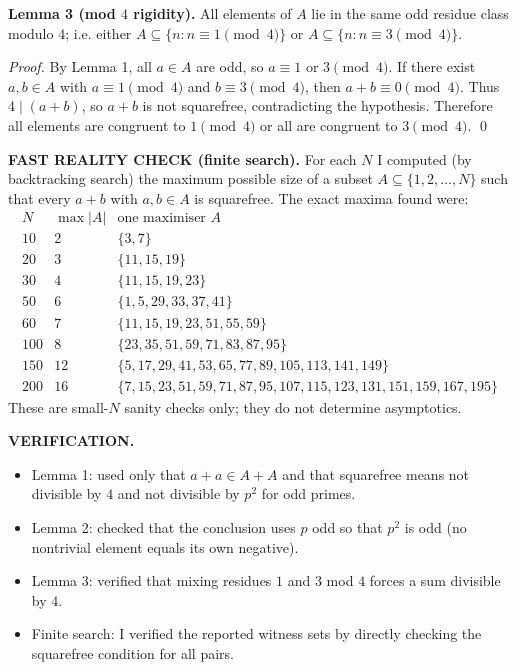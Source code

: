 \medskip
\noindent\textbf{Lemma 3 (mod $4$ rigidity).}
All elements of $A$ lie in the same odd residue class modulo $4$; i.e. either $A\subseteq\{n: n\equiv 1\pmod 4\}$ or $A\subseteq\{n: n\equiv 3\pmod 4\}$.

\noindent\emph{Proof.}
By Lemma 1, all $a\in A$ are odd, so $a\equiv 1$ or $3\pmod 4$.
If there exist $a,b\in A$ with $a\equiv 1\pmod 4$ and $b\equiv 3\pmod 4$, then $a+b\equiv 0\pmod 4$.
Thus $4\mid(a+b)$, so $a+b$ is not squarefree, contradicting the hypothesis.
Therefore all elements are congruent to $1\pmod 4$ or all are congruent to $3\pmod 4$. \qed

\medskip
\noindent\textbf{FAST REALITY CHECK (finite search).}
For each $N$ I computed (by backtracking search) the maximum possible size of a subset $A\subseteq\{1,2,\dots,N\}$ such that every $a+b$ with $a,b\in A$ is squarefree.
The exact maxima found were:
\[
\begin{array}{c|c|l}
N & \max|A| & \text{one maximiser }A\\\hline
10 & 2 & \{3,7\}\\
20 & 3 & \{11,15,19\}\\
30 & 4 & \{11,15,19,23\}\\
50 & 6 & \{1,5,29,33,37,41\}\\
60 & 7 & \{11,15,19,23,51,55,59\}\\
100 & 8 & \{23,35,51,59,71,83,87,95\}\\
150 & 12 & \{5,17,29,41,53,65,77,89,105,113,141,149\}\\
200 & 16 & \{7,15,23,51,59,71,87,95,107,115,123,131,151,159,167,195\}
\end{array}
\]
These are small-$N$ sanity checks only; they do not determine asymptotics.

\medskip
\noindent\textbf{VERIFICATION.}
\begin{itemize}
\item Lemma 1: used only that $a+a\in A+A$ and that squarefree means not divisible by $4$ and not divisible by $p^2$ for odd primes.
\item Lemma 2: checked that the conclusion uses $p$ odd so that $p^2$ is odd (no nontrivial element equals its own negative).
\item Lemma 3: verified that mixing residues $1$ and $3$ mod $4$ forces a sum divisible by $4$.
\item Finite search: I verified the reported witness sets by directly checking the squarefree condition for all pairs.
\end{itemize}

